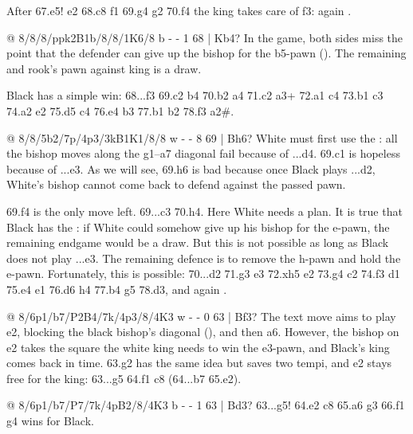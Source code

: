 After 67.\K e5! \B e2 68.\B c8 \B f1 69.\B g4 \B g2 70.\K f4 the king takes care of f3: again
.

@ 8/8/8/ppk2B1b/8/8/1K6/8 b - - 1 68 | Kb4?
In the game, both sides miss the point that the defender can give up the bishop for the
b5-pawn ().
The remaining  and rook's pawn
against king is a draw.

Black has a simple win: 68...\B f3 69.\K c2 b4 70.\K b2 a4 71.\B c2 a3+ 72.\K a1 \K c4 73.\B b1
\K c3 74.\B a2 \B e2 75.\B d5 \B c4 76.\B e4 b3 77.\K b1 b2 78.\B f3 a2\#.

@ 8/8/5b2/7p/4p3/3kB1K1/8/8 w - - 8 69 | Bh6?
White must first use the :
all the bishop moves along the g1--a7 diagonal fail because of ...\B d4. 69.\B c1 is hopeless
because of ...e3. As we will see, 69.\B h6 is bad because once Black plays ...\B d2, White's bishop
cannot come back to defend against the passed pawn.

69.\B f4 is the only move left. 69...\B c3 70.\K h4. Here White needs a plan. It is true that
Black has the : if
White could somehow give up his bishop for the e-pawn, the remaining endgame would be a draw. But
this is not possible as long as Black does not play ...e3. The remaining defence is to remove the
h-pawn and hold the e-pawn. Fortunately, this is possible: 70...\B d2 71.\B g3 e3 72.\K xh5 e2
73.\K g4 \K c2 74.\K f3 \K d1 75.\K e4 \B e1 76.\B d6 \B h4 77.\B b4 \B g5 78.\K d3, and again
.

@ 8/6p1/b7/P2B4/7k/4p3/8/4K3 w - - 0 63 | Bf3?
The text move aims to play \B e2, blocking the black bishop's diagonal
(), and then a6. However, the bishop on e2 takes
the square the white king needs to win the e3-pawn, and Black's king comes back in time.
63.\B g2 has the same idea but saves two tempi, and e2 stays free for the king: 63...g5 64.\B f1
\B c8 (64...\B b7 65.\K e2).

@ 8/6p1/b7/P7/7k/4pB2/8/4K3 b - - 1 63 | Bd3?
63...g5! 64.\B e2 \B c8 65.a6 \K g3 66.\B f1 g4 wins for Black.

